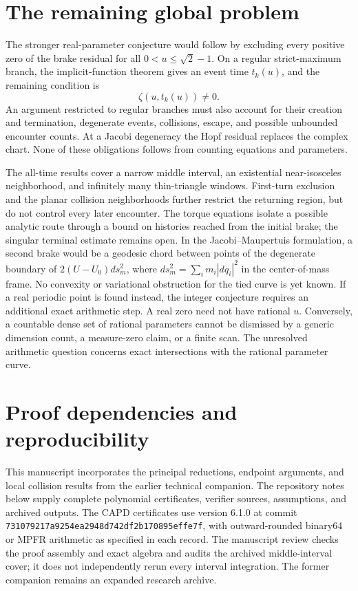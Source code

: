 \section{The remaining global problem}\label{sec:outlook}

The stronger real-parameter conjecture would follow by excluding every
positive zero of the brake residual for all $0<u\le\sqrt2-1$. On a
regular strict-maximum branch, the implicit-function theorem gives an
event time $t_k(u)$, and the remaining condition is
\[
 \zeta(u,t_k(u))\ne0.
\]
An argument restricted to regular branches must also account for their
creation and termination, degenerate events, collisions, escape, and
possible unbounded encounter counts. At a Jacobi degeneracy the Hopf
residual replaces the complex chart. None of these obligations follows
from counting equations and parameters.

The all-time results cover a narrow middle interval, an existential
near-isosceles neighborhood, and infinitely many thin-triangle windows.
First-turn exclusion and the planar collision neighborhoods further
restrict the returning region, but do not control every later encounter.
The torque equations isolate a possible analytic route through a bound
on histories reached from the initial brake; the singular terminal
estimate remains open. In the Jacobi--Maupertuis formulation, a second
brake would be a geodesic chord between points of the degenerate boundary
of $2(U-U_0)ds_m^2$, where $ds_m^2=\sum_i m_i|dq_i|^2$ in the
center-of-mass frame. No convexity or variational obstruction for the
tied curve is yet known.
If a real periodic point is found instead, the integer conjecture requires
an additional exact arithmetic step. A real zero need not have rational
$u$. Conversely, a countable dense set of rational parameters cannot be
dismissed by a generic dimension count, a measure-zero claim, or a finite
scan. The unresolved arithmetic question concerns exact intersections
with the rational parameter curve.

\appendix
\section{Proof dependencies and reproducibility}\label{sec:reproduction}

This manuscript incorporates the principal reductions, endpoint arguments,
and local collision results from the earlier technical companion.
The repository notes below supply complete polynomial certificates,
verifier sources, assumptions, and archived outputs. The CAPD certificates
use version 6.1.0 at commit
\texttt{731079217a9254ea2948d742df2b170895effe7f}, with outward-rounded
binary64 or MPFR arithmetic as specified in each record. The manuscript
review checks the proof assembly and exact algebra and audits the archived
middle-interval cover; it does not independently rerun every interval
integration. The former companion remains an expanded research archive.

